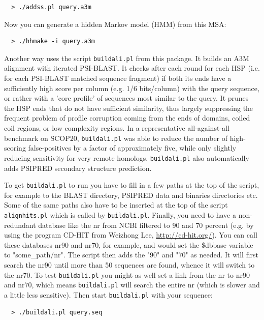 \documentclass[11pt,a4paper]{article}
\begin{document}
\begin{verbatim}
  > ./addss.pl query.a3m
\end{verbatim}

Now you can generate a hidden Markov model (HMM) from this MSA:
\begin{verbatim}
  > ./hhmake -i query.a3m
\end{verbatim}



Another way uses the script \verb`buildali.pl` from this package. It builds an A3M alignment 
with iterated PSI-BLAST. It checks after each round for each HSP (i.e. for each PSI-BLAST 
matched sequence fragment) if both its ends have a sufficiently high score per column 
(e.g. 1/6 bits/column) with the query sequence, or rather with a 'core profile' of sequences 
most similar to the query. It prunes the HSP ends that do not have sufficient similarity, 
thus largely suppressing the frequent problem of profile corruption coming from the ends of 
domains, coiled coil regions, or low complexity regions. In a representative all-against-all 
benchmark on SCOP20, \verb`buildali.pl` was able to reduce the number of high-scoring 
false-positives by a factor of approximately five, while only slightly reducing sensitivity 
for very remote homologs. \verb`buildali.pl` also automatically adds PSIPRED secondary structure 
prediction. 

To get \verb`buildali.pl` to run you have to fill in a few paths at the top of the script, 
for example to the BLAST directory, PSIPRED data and binaries directories etc. Some of 
the same paths also have to be inserted at the top of the script \verb`alignhits.pl` which 
is called by \verb`buildali.pl`. Finally, you need to have a non-redundant database like the 
nr from NCBI filtered to 90 and 70 percent (e.g. by using the program CD-HIT from 
Weizhong Lee, \url{http://cd-hit.org/}). You can call these databases nr90 and nr70, for 
example, and would set the \$dbbase variable to "some\_path/nr". The script then adds 
the "90" and "70" as needed. It will first search the nr90 until more than 50 
sequences are found, whence it will switch to the nr70. To test \verb`buildali.pl` you might 
as well set a link from the nr to nr90 and nr70, which means \verb`buildali.pl` will search 
the entire nr (which is slower and a little less sensitive). Then start \verb`buildali.pl` 
with your sequence:
\begin{verbatim}
  > ./buildali.pl query.seq
\end{verbatim}
\end{document}
